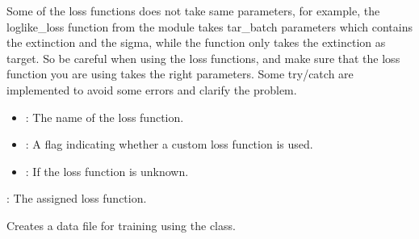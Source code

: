\documentclass[letterpaper,10pt,english]{sphinxmanual}
\begin{document}
\begin{fulllineitems}
\begin{fulllineitems}
\begin{description}
\sphinxAtStartPar
Some of the loss functions does not take same parameters, for example, the loglike\_loss function
from the  module takes tar\_batch parameters
which contains the extinction and the sigma, while the  function only takes
the extinction as target.
So be careful when using the loss functions, and make sure that the loss function you are using takes
the right parameters.
Some try/catch are implemented to avoid some errors and clarify the problem.

\begin{itemize}
\item {} 
\sphinxAtStartPar
{}: The name of the loss function.

\item {} 
\sphinxAtStartPar
{}: A flag indicating whether a custom loss function is used.

\end{itemize}

\begin{itemize}
\item {} 
\sphinxAtStartPar
{}: If the loss function is unknown.

\end{itemize}

\sphinxAtStartPar
{}: The assigned loss function.

\end{description}

\end{fulllineitems}


\begin{fulllineitems}
\label{\detokenize{MainProgram:MainProgram.MainProgram.create_data_file}}
\pysigstartsignatures
{}
\pysigstopsignatures
\sphinxAtStartPar
Creates a data file for training using the  class.

\end{fulllineitems}



\end{fulllineitems}
\end{document}

